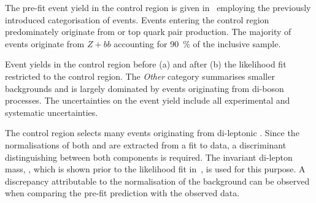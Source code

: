The pre-fit event yield in the \ZHF control region is given
in~ employing the previously introduced
categorisation of \Zjets events. Events entering the control region
predominately originate from \ZHF or top quark pair production.
The majority of \ZHF events originate from $Z + bb$ accounting for
\SI{90}{\percent} of the inclusive sample.

\begin{table}[htbp]
  \caption{Event yields in the \ZHF control region before (a) and
    after (b) the likelihood fit restricted to the control region. The
    \emph{Other} category summarises smaller backgrounds and is
    largely dominated by events originating from di-boson
    processes. The uncertainties on the event yield include all
    experimental and systematic uncertainties.}%
  \label{tab:zcr_yields}

  \begin{subtable}{0.5\textwidth}
    \centering

    \label{tab:zcr_prefit_yields}

    
  \end{subtable}
  \begin{subtable}{0.5\textwidth}
    \centering

    \label{tab:zcr_postfit_yields}

    
  \end{subtable}
\end{table}

The \ZHF control region selects many events originating from
di-leptonic \ttbar. Since the normalisations of both \ttbar and \ZHF
are extracted from a fit to data, a discriminant distinguishing
between both components is required. The invariant di-lepton mass,
\mll, which is shown prior to the likelihood fit
in~, is used for this purpose. A discrepancy
attributable to the normalisation of the \ZHF background can be
observed when comparing the pre-fit prediction with the observed data.

